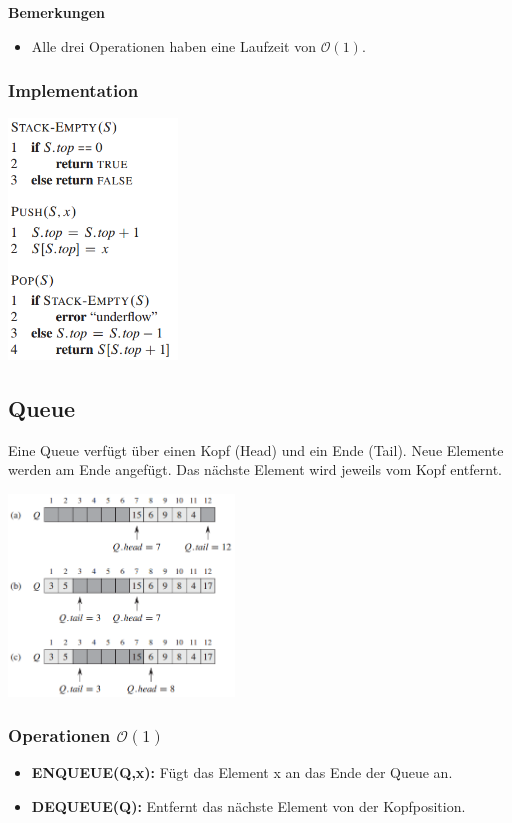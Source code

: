 \documentclass[10pt,a4paper,twocolumn]{article}
\begin{document}
\textbf{Bemerkungen}
\begin{itemize}
\item Alle drei Operationen haben eine Laufzeit von $\mathcal{O}(1)$.
\end{itemize}

\subsubsection{Implementation}
\begin{center}
\includegraphics[width=4.5cm]{images/stack-implementation.png}
\end{center}

\subsection{Queue}
Eine Queue verfügt über einen Kopf (Head) und ein Ende (Tail). Neue Elemente werden am Ende angefügt. Das nächste Element wird jeweils vom Kopf entfernt.

\begin{center}
\includegraphics[width=6cm]{images/queue-layout.png}
\end{center}

\subsubsection{Operationen $\mathcal{O}(1)$}
\begin{itemize}
\item \textbf{ENQUEUE(Q,x):} Fügt das Element x an das Ende der Queue an.
\item \textbf{DEQUEUE(Q):} Entfernt das nächste Element von der Kopfposition.
\end{itemize}
\end{document}
